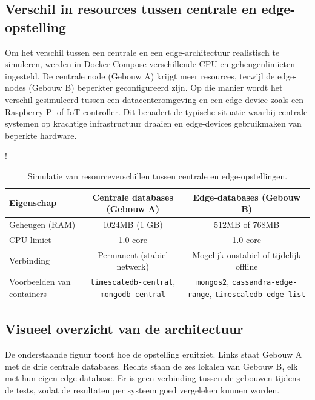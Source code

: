 \subsection{Verschil in resources tussen centrale en edge-opstelling}

Om het verschil tussen een centrale en een edge-architectuur realistisch te simuleren, werden in Docker Compose verschillende CPU en geheugenlimieten ingesteld.
 De centrale node (Gebouw A) krijgt meer resources, terwijl de edge-nodes (Gebouw B) beperkter geconfigureerd zijn.
Op die manier wordt het verschil gesimuleerd tussen een datacenteromgeving en een edge-device zoals een Raspberry Pi of IoT-controller.
 Dit benadert de typische situatie waarbij centrale systemen op krachtige infrastructuur draaien en edge-devices gebruikmaken van beperkte hardware.
\begin{table}[H]
\centering
\begin{resizebox}{\textwidth}{!}{
  \begin{tabular}{|l|c|c|}
  \hline
  \textbf{Eigenschap} & \textbf{Centrale databases (Gebouw A)} & \textbf{Edge-databases (Gebouw B)} \\
  \hline
  Geheugen (RAM) & 1024MB (1 GB) & 512MB of 768MB \\
  CPU-limiet & 1.0 core & 1.0 core \\
  Verbinding & Permanent (stabiel netwerk) & Mogelijk onstabiel of tijdelijk offline \\
  Voorbeelden van containers & \texttt{timescaledb-central}, \texttt{mongodb-central} & \texttt{mongos2}, \texttt{cassandra-edge-range}, \texttt{timescaledb-edge-list} \\
  \hline
  \end{tabular}
}
\end{resizebox}
\caption{Simulatie van resourceverschillen tussen centrale en edge-opstellingen.}
\label{tab:resources}
\end{table}

\subsection{Visueel overzicht van de architectuur}

De onderstaande figuur toont hoe de opstelling eruitziet. Links staat Gebouw A met de drie centrale databases. Rechts staan de zes lokalen van Gebouw B, elk met hun eigen edge-database. Er is geen verbinding tussen de gebouwen tijdens de tests, zodat de resultaten per systeem goed vergeleken kunnen worden.

